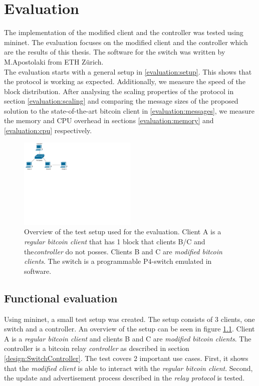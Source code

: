\chapter{Evaluation \label{evaluation}}
The implementation of the modified client and the controller was tested using mininet. The evaluation focuses on the modified client and the controller which are the results of this thesis. The software for the switch was written by M.Apostolaki from ETH Zürich.\\
The evaluation starts with a general setup in \ref{evaluation:setup}. This shows that the protocol is working as expected. Additionally, we measure the speed of the block distribution. After analysing the scaling properties of the protocol in section \ref{evaluation:scaling} and comparing the message sizes of the proposed solution to the state-of-the-art bitcoin client in \ref{evaluation:messages}, we measure the memory and CPU overhead in sections \ref{evaluation:memory} and \ref{evaluation:cpu} respectively.

\begin{figure}[!hbt]
  \begin{center}
	\includegraphics[width=0.5\textwidth]{Figures/Test_setup.pdf}
	  \end{center}

  \caption[Overview of the test setup used for the evaluation.]{Overview of the test setup used for the evaluation. Client A is a \textit{regular bitcoin client} that has 1 block that clients B/C and the\textit{controller} do not posses. Clients B and C are \textit{modified bitcoin clients}. The switch is a programmable P4-switch emulated in software.}
  \label{figure:test_setup}
\end{figure}

\section{\label{evaluation:setup}Functional evaluation}
Using mininet, a small test setup was created. The setup consists of 3 clients, one switch and a controller. An overview of the setup can be seen in figure \ref{figure:test_setup}. Client A is a \textit{regular bitcoin client} and clients B and C are \textit{modified bitcoin clients}. The controller is a bitcoin relay \textit{controller} as described in section \ref{design:SwitchController}. The test covers 2 important use cases. First, it shows that the \textit{modified client} is able to interact with the \textit{regular bitcoin client}. Second, the update and advertisement process described in the \textit{relay protocol} is tested. 
